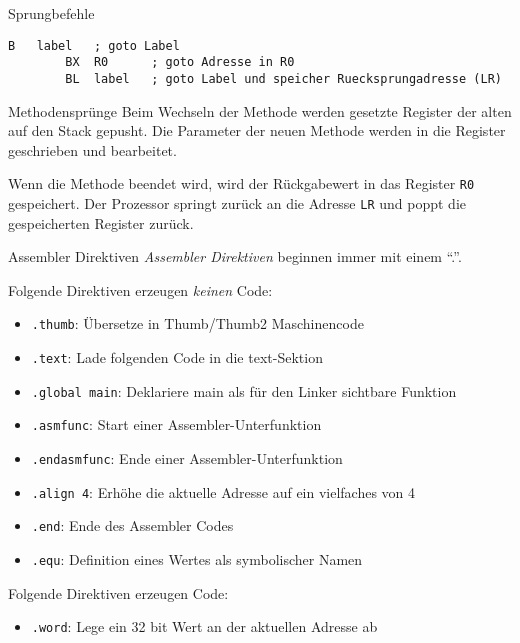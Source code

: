 \begin{defi}{Sprungbefehle}
    \begin{lstlisting}[language={[x86masm]Assembler}]
        B   label   ; goto Label
        BX  R0      ; goto Adresse in R0
        BL  label   ; goto Label und speicher Ruecksprungadresse (LR)
    \end{lstlisting}
\end{defi}

\begin{bonus}{Methodensprünge}
    Beim Wechseln der Methode werden gesetzte Register der alten auf den Stack gepusht.
    Die Parameter der neuen Methode werden in die Register geschrieben und bearbeitet.

    Wenn die Methode beendet wird, wird der Rückgabewert in das Register \texttt{R0} gespeichert.
    Der Prozessor springt zurück an die Adresse \texttt{LR} und poppt die gespeicherten Register zurück.
\end{bonus}

\begin{bonus}{Assembler Direktiven}
    \emph{Assembler Direktiven} beginnen immer mit einem \enquote{.}.

    Folgende Direktiven erzeugen \emph{keinen} Code:
    \begin{itemize}
        \item \texttt{.thumb}: Übersetze in Thumb/Thumb2 Maschinencode
        \item \texttt{.text}: Lade folgenden Code in die text-Sektion
        \item \texttt{.global main}: Deklariere main als für den Linker sichtbare Funktion
        \item \texttt{.asmfunc}: Start einer Assembler-Unterfunktion
        \item \texttt{.endasmfunc}: Ende einer Assembler-Unterfunktion
        \item \texttt{.align 4}: Erhöhe die aktuelle Adresse auf ein vielfaches von 4
        \item \texttt{.end}: Ende des Assembler Codes
        \item \texttt{.equ}: Definition eines Wertes als symbolischer Namen
    \end{itemize}

    Folgende Direktiven erzeugen Code:
    \begin{itemize}
        \item \texttt{.word}: Lege ein 32 bit Wert an der aktuellen Adresse ab
    \end{itemize}
\end{bonus}

